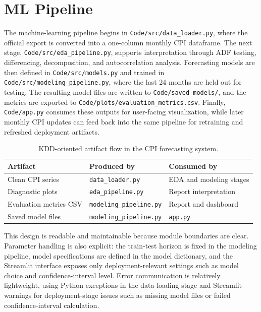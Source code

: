 \section{ML Pipeline}

The machine-learning pipeline begins in \texttt{Code/src/data\_loader.py}, where the official export is converted into a one-column monthly CPI dataframe. The next stage, \texttt{Code/src/eda\_pipeline.py}, supports interpretation through ADF testing, differencing, decomposition, and autocorrelation analysis. Forecasting models are then defined in \texttt{Code/src/models.py} and trained in \texttt{Code/src/modeling\_pipeline.py}, where the last 24 months are held out for testing. The resulting model files are written to \texttt{Code/saved\_models/}, and the metrics are exported to \texttt{Code/plots/evaluation\_metrics.csv}. Finally, \texttt{Code/app.py} consumes these outputs for user-facing visualization, while later monthly CPI updates can feed back into the same pipeline for retraining and refreshed deployment artifacts.

\begin{table}[htbp]
    \centering
    \caption{KDD-oriented artifact flow in the CPI forecasting system.}
    \label{tab:kdd-artifact-flow}
    \begin{tabular}{p{3.6cm}p{4cm}p{4.8cm}}
        \hline
        Artifact & Produced by & Consumed by \\
        \hline
        Clean CPI series & \texttt{data\_loader.py} & EDA and modeling stages \\
        Diagnostic plots & \texttt{eda\_pipeline.py} & Report interpretation \\
        Evaluation metrics CSV & \texttt{modeling\_pipeline.py} & Report and dashboard \\
        Saved model files & \texttt{modeling\_pipeline.py} & \texttt{app.py} \\
        \hline
    \end{tabular}
\end{table}

This design is readable and maintainable because module boundaries are clear. Parameter handling is also explicit: the train-test horizon is fixed in the modeling pipeline, model specifications are defined in the model dictionary, and the Streamlit interface exposes only deployment-relevant settings such as model choice and confidence-interval level. Error communication is relatively lightweight, using Python exceptions in the data-loading stage and Streamlit warnings for deployment-stage issues such as missing model files or failed confidence-interval calculation.
